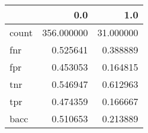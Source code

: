 \begin{tabular}{lrr}
\toprule
{} &         0.0 &        1.0 \\
\midrule
count &  356.000000 &  31.000000 \\
fnr   &    0.525641 &   0.388889 \\
fpr   &    0.453053 &   0.164815 \\
tnr   &    0.546947 &   0.612963 \\
tpr   &    0.474359 &   0.166667 \\
bacc  &    0.510653 &   0.213889 \\
\bottomrule
\end{tabular}
